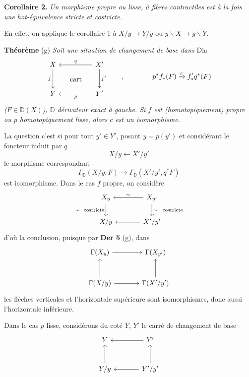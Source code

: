 \documentclass[11pt]{article}
\newcommand{\printedpage}[1]{\marginpar{\footnotesize p.~#1}}
\newcommand{\msp}[1]{\marginpar{\footnotesize [#1]}}
\newcommand{\DD}{\mathbb{D}}
\begin{document}
\noindent\textbf{Corollaire 2.} \textit{Un morphisme propre ou lisse, à fibres contractiles est à la fois une hot-équivalence stricte et costricte.}

En effet, on applique le corollaire 1 à $X/y \to Y/y$ ou $y\backslash X \to y\backslash Y$.

\noindent\textbf{Théorème} (g) \textit{Soit une situation de changement de base dans} \textsf{Dia}
\[
\begin{tikzcd}[row sep=large, column sep=huge]
X \arrow[d, "f"'] \arrow[dr, phantom, "\text{cart}"] & X' \arrow[l, "q"'] \arrow[d, "f'"] \\
Y & Y' \arrow[l, "p"]
\end{tikzcd}
\qquad , \qquad\qquad p^*f_*(F) \xrightarrow{c} f'_*q^*(F)
\]
\textit{($F \in \DD(X)$), $\DD$ dérivateur exact à gauche. Si $f$ est (homotopiquement) propre ou $p$ homotopiquement lisse, alors $c$ est un isomorphisme.}

\noindent\msp{page 57}
La question c'est si pour tout $y' \in Y'$, posant $y = p(y')$ et considérant le foncteur induit par $q$
\[
X/y \longleftarrow X'/y'
\]
le morphisme correspondant
\[
\Gamma_{\DD}(X/y, F) \longrightarrow \Gamma_{\DD}(X'/y', q^*F)
\]
est isomorphisme. Dans le cas $f$ propre, on considère
\[
\begin{tikzcd}[column sep=large]
X_y \arrow[d, "\sim\ \ \text{costricte}"'] & X_{y'} \arrow[l, "\sim"'] \arrow[d, "\sim\ \ \text{costricte}"] \\
X/y & X'/y' \arrow[l]
\end{tikzcd}
\]
d'où la conclusion, puisque par \textbf{Der 5} (g), dans
\[
\begin{tikzcd}[row sep=large, column sep=large]
\Gamma(X_y) \arrow[r] & \Gamma(X_{y'}) \\
\Gamma(X/y) \arrow[u] \arrow[r] & \Gamma(X'/y') \arrow[u]
\end{tikzcd}
\]
les flèches verticales et l'horizontale supérieure sont isomorphismes, donc aussi l'horizontale inférieure.

\printedpage{33}

Dans le cas $p$ lisse, considérons du coté $Y$, $Y'$ le carré de changement de base %
\[
\begin{tikzcd}[row sep=large, column sep=large]
Y & Y' \arrow[l] \\
Y/y \arrow[u] & Y'/y' \arrow[l] \arrow[u]
\end{tikzcd}
\]
\end{document}
